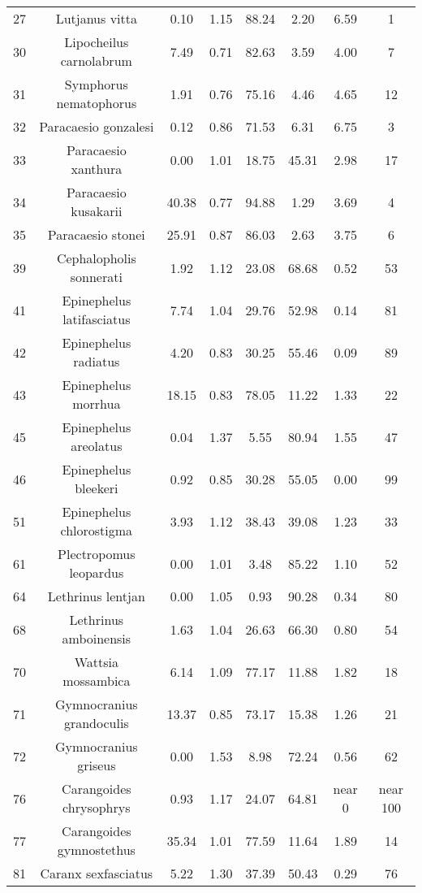 \documentclass{report}\usepackage[]{graphicx}\usepackage[]{color}
\begin{document}
\begin{table}[ht]
{\begin{tabular}{cccccccc}
   27 & Lutjanus vitta & 0.10 & 1.15 & 88.24 & 2.20 & 6.59 & 1 \\ 
   30 & Lipocheilus carnolabrum & 7.49 & 0.71 & 82.63 & 3.59 & 4.00 & 7 \\ 
   31 & Symphorus nematophorus & 1.91 & 0.76 & 75.16 & 4.46 & 4.65 & 12 \\ 
   32 & Paracaesio gonzalesi & 0.12 & 0.86 & 71.53 & 6.31 & 6.75 & 3 \\ 
   33 & Paracaesio xanthura & 0.00 & 1.01 & 18.75 & 45.31 & 2.98 & 17 \\ 
   34 & Paracaesio kusakarii & 40.38 & 0.77 & 94.88 & 1.29 & 3.69 & 4 \\ 
   35 & Paracaesio stonei & 25.91 & 0.87 & 86.03 & 2.63 & 3.75 & 6 \\ 
   39 & Cephalopholis sonnerati & 1.92 & 1.12 & 23.08 & 68.68 & 0.52 & 53 \\ 
   41 & Epinephelus latifasciatus & 7.74 & 1.04 & 29.76 & 52.98 & 0.14 & 81 \\ 
   42 & Epinephelus radiatus & 4.20 & 0.83 & 30.25 & 55.46 & 0.09 & 89 \\ 
   43 & Epinephelus morrhua & 18.15 & 0.83 & 78.05 & 11.22 & 1.33 & 22 \\ 
   45 & Epinephelus areolatus & 0.04 & 1.37 & 5.55 & 80.94 & 1.55 & 47 \\ 
   46 & Epinephelus bleekeri & 0.92 & 0.85 & 30.28 & 55.05 & 0.00 & 99 \\ 
   51 & Epinephelus chlorostigma & 3.93 & 1.12 & 38.43 & 39.08 & 1.23 & 33 \\ 
   61 & Plectropomus leopardus & 0.00 & 1.01 & 3.48 & 85.22 & 1.10 & 52 \\ 
   64 & Lethrinus lentjan & 0.00 & 1.05 & 0.93 & 90.28 & 0.34 & 80 \\ 
   68 & Lethrinus amboinensis & 1.63 & 1.04 & 26.63 & 66.30 & 0.80 & 54 \\ 
   70 & Wattsia mossambica & 6.14 & 1.09 & 77.17 & 11.88 & 1.82 & 18 \\ 
   71 & Gymnocranius grandoculis & 13.37 & 0.85 & 73.17 & 15.38 & 1.26 & 21 \\ 
   72 & Gymnocranius griseus & 0.00 & 1.53 & 8.98 & 72.24 & 0.56 & 62 \\ 
   76 & Carangoides chrysophrys & 0.93 & 1.17 & 24.07 & 64.81 & near 0 & near 100 \\ 
   77 & Carangoides gymnostethus & 35.34 & 1.01 & 77.59 & 11.64 & 1.89 & 14 \\ 
   81 & Caranx sexfasciatus & 5.22 & 1.30 & 37.39 & 50.43 & 0.29 & 76 \\ 

\end{tabular}}
\end{table}
\end{document}
